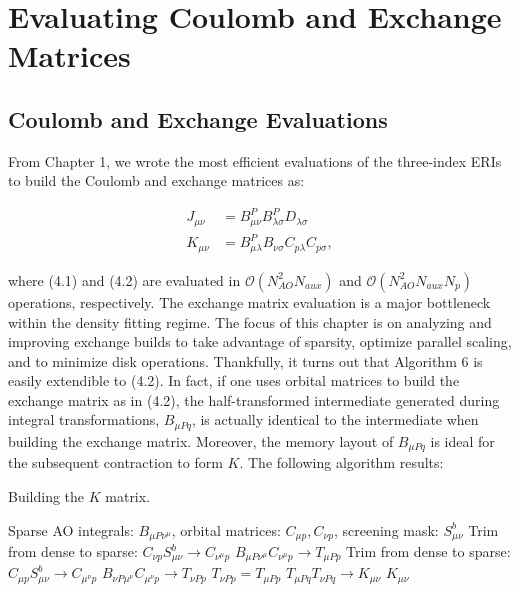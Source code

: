 \chapter{Evaluating Coulomb and Exchange Matrices}

\section{Coulomb and Exchange Evaluations}

From Chapter 1, we wrote the most efficient evaluations of the three-index ERIs to build the Coulomb and exchange matrices as:

\begin{align}
J_{\mu \nu} &= B_{\mu \nu}^P B_{\lambda \sigma}^PD_{\lambda \sigma} \\
K_{\mu \nu} &= B_{\mu \lambda}^P B_{\nu \sigma}C_{p\lambda}C_{p\sigma},
\end{align}

\noindent where (4.1) and (4.2) are evaluated in $\mathcal{O}(N_{AO}^2N_{aux})$ and $\mathcal{O}(N_{AO}^2N_{aux}N_p)$ operations, respectively.
The exchange matrix evaluation is a major bottleneck within the density fitting regime. The focus of this chapter is on analyzing and improving
exchange builds to take advantage of sparsity, optimize parallel scaling, and to minimize disk operations.
Thankfully, it turns out that Algorithm 6 is easily 
extendible to (4.2). In fact, if one uses orbital matrices to build the exchange matrix as in (4.2), the half-transformed 
intermediate generated during integral transformations, $B_{\mu Pq}$, is actually identical to the intermediate when building the exchange matrix. 
Moreover, the memory layout of $B_{\mu Pq}$ is ideal for the subsequent contraction to form $K$. The following algorithm results:

\begin{algorithm}[H]
\caption{Building the $K$ matrix.}
\begin{algorithmic}
\REQUIRE Sparse AO integrals: $B_{\mu P \nu^\mu}$, orbital matrices: $C_{\mu p}, C_{\nu p}$, screening mask: $S_{\mu \nu}^b$
    \STATE Trim from dense to sparse: $C_{\nu p}S_{\mu \nu}^b \rightarrow C_{\nu^{\mu} p}$
    \STATE $B_{\mu P \nu^{\mu}} C_{\nu^{\mu} p} \rightarrow T_{\mu Pp}$
        \STATE Trim from dense to sparse: $C_{\mu p}S_{\mu \nu}^b \rightarrow C_{\mu^{\nu} p}$
        \STATE $B_{\nu P \mu^{\nu}} C_{\mu^{\nu} p} \rightarrow T_{\nu P p}$
    \ELSE
        \STATE $T_{\nu P p} = T_{\mu P p}$ 
    \ENDIF
\ENDFOR
\STATE $T_{\mu P q} T_{\nu P q} \rightarrow K_{\mu \nu} $
\RETURN $K_{\mu \nu}$
\end{algorithmic}
\end{algorithm}

